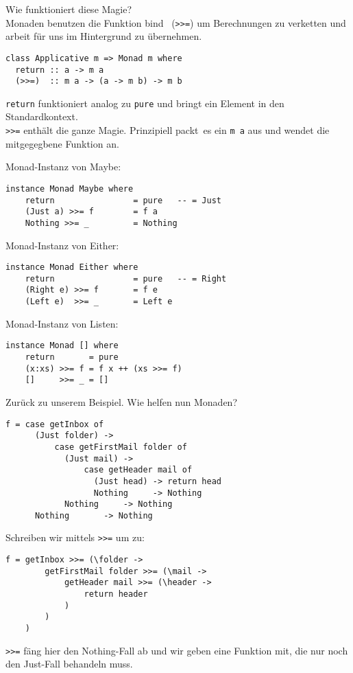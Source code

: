 \documentclass{beamer}
\begin{document}
\begin{frame}[fragile]
Wie funktioniert diese Magie?\\
\pause
Monaden benutzen die Funktion \glqq bind \grqq \ (\texttt{>>=}) um Berechnungen zu verketten und arbeit für uns im Hintergrund zu übernehmen.\\
\pause
\begin{verbatim}
class Applicative m => Monad m where
  return :: a -> m a
  (>>=)  :: m a -> (a -> m b) -> m b
\end{verbatim}
\pause
\texttt{return} funktioniert analog zu \texttt{pure} und bringt ein Element in den Standardkontext.\\
\texttt{>>=} enthält die ganze Magie. Prinzipiell \glqq packt\grqq \ es ein \texttt{m a} aus und wendet die mitgegegbene Funktion an.
\end{frame}

\begin{frame}[fragile]
Monad-Instanz von Maybe:
\begin{verbatim}
instance Monad Maybe where
    return                = pure   -- = Just
    (Just a) >>= f        = f a
    Nothing >>= _         = Nothing
\end{verbatim}
\pause
Monad-Instanz von Either:
\begin{verbatim}
instance Monad Either where
    return                = pure   -- = Right
    (Right e) >>= f       = f e
    (Left e)  >>= _       = Left e
\end{verbatim}
\pause
Monad-Instanz von Listen:
\begin{verbatim}
instance Monad [] where
    return       = pure
    (x:xs) >>= f = f x ++ (xs >>= f)
    []     >>= _ = []
\end{verbatim}
\end{frame}

\begin{frame}[fragile]
Zurück zu unserem Beispiel. Wie helfen nun Monaden?
\pause
\begin{verbatim}
f = case getInbox of
      (Just folder) -> 
          case getFirstMail folder of
            (Just mail) -> 
                case getHeader mail of
                  (Just head) -> return head
                  Nothing     -> Nothing
            Nothing     -> Nothing
      Nothing       -> Nothing
\end{verbatim}
\end{frame}

\begin{frame}[fragile]
Schreiben wir mittels \texttt{>>=} um zu:
\pause
\begin{verbatim}
f = getInbox >>= (\folder ->
        getFirstMail folder >>= (\mail ->
            getHeader mail >>= (\header ->
                return header
            )
        )
    )
\end{verbatim}
\pause
\texttt{>>=} fäng hier den Nothing-Fall ab und wir geben eine Funktion mit, die nur noch den Just-Fall behandeln muss.
\end{frame}
\end{document}
